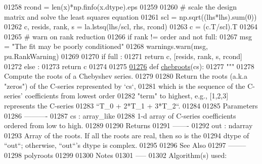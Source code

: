 \begin{DoxyCode}
01258         rcond = len(x)*np.finfo(x.dtype).eps
01259 
01260     \textcolor{comment}{# scale the design matrix and solve the least squares equation}
01261     scl = np.sqrt((lhs*lhs).sum(0))
01262     c, resids, rank, s = la.lstsq(lhs/scl, rhs, rcond)
01263     c = (c.T/scl).T
01264 
01265     \textcolor{comment}{# warn on rank reduction}
01266     \textcolor{keywordflow}{if} rank != order \textcolor{keywordflow}{and} \textcolor{keywordflow}{not} full:
01267         msg = \textcolor{stringliteral}{"The fit may be poorly conditioned"}
01268         warnings.warn(msg, pu.RankWarning)
01269 
01270     \textcolor{keywordflow}{if} full :
01271         \textcolor{keywordflow}{return} c, [resids, rank, s, rcond]
01272     \textcolor{keywordflow}{else} :
01273         \textcolor{keywordflow}{return} c
01274 
01275 
\hypertarget{chebyshev_8py_source_l01276}{}\hyperlink{namespacepyneb_1_1utils_1_1chebyshev_a2f01a14e36b415a2f3ebc67c95cceb26}{01276} \textcolor{keyword}{def }\hyperlink{namespacepyneb_1_1utils_1_1chebyshev_a2f01a14e36b415a2f3ebc67c95cceb26}{chebroots}(cs):
01277     \textcolor{stringliteral}{"""}
01278 \textcolor{stringliteral}{    Compute the roots of a Chebyshev series.}
01279 \textcolor{stringliteral}{}
01280 \textcolor{stringliteral}{    Return the roots (a.k.a "zeros") of the C-series represented by `cs`,}
01281 \textcolor{stringliteral}{    which is the sequence of the C-series' coefficients from lowest order}
01282 \textcolor{stringliteral}{    "term" to highest, e.g., [1,2,3] represents the C-series}
01283 \textcolor{stringliteral}{    ``T\_0 + 2*T\_1 + 3*T\_2``.}
01284 \textcolor{stringliteral}{}
01285 \textcolor{stringliteral}{    Parameters}
01286 \textcolor{stringliteral}{    ----------}
01287 \textcolor{stringliteral}{    cs : array\_like}
01288 \textcolor{stringliteral}{        1-d array of C-series coefficients ordered from low to high.}
01289 \textcolor{stringliteral}{}
01290 \textcolor{stringliteral}{    Returns}
01291 \textcolor{stringliteral}{    -------}
01292 \textcolor{stringliteral}{    out : ndarray}
01293 \textcolor{stringliteral}{        Array of the roots.  If all the roots are real, then so is the}
01294 \textcolor{stringliteral}{        dtype of ``out``; otherwise, ``out``'s dtype is complex.}
01295 \textcolor{stringliteral}{}
01296 \textcolor{stringliteral}{    See Also}
01297 \textcolor{stringliteral}{    --------}
01298 \textcolor{stringliteral}{    polyroots}
01299 \textcolor{stringliteral}{}
01300 \textcolor{stringliteral}{    Notes}
01301 \textcolor{stringliteral}{    -----}
01302 \textcolor{stringliteral}{    Algorithm(s) used:}

\end{DoxyCode}
